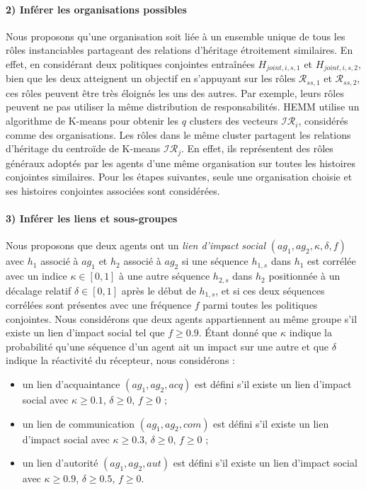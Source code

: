\documentclass[sigconf,anonymous]{aamas}
\begin{document}
\paragraph{2) Inférer les organisations possibles}

Nous proposons qu'une organisation soit liée à un ensemble unique de tous les rôles instanciables partageant des relations d'héritage étroitement similaires. En effet, en considérant deux politiques conjointes entraînées $H_{joint,i,s,1}$ et $H_{joint,i,s,2}$, bien que les deux atteignent un objectif en s'appuyant sur les rôles $\mathcal{R}_{ss,1}$ et $\mathcal{R}_{ss,2}$, ces rôles peuvent être très éloignés les uns des autres. Par exemple, leurs rôles peuvent ne pas utiliser la même distribution de responsabilités.
HEMM utilise un algorithme de K-means pour obtenir les $q$ clusters des vecteurs $\mathcal{IR}_{i}$, considérés comme des organisations. Les rôles dans le même cluster partagent les relations d'héritage du centroïde de K-means $\mathcal{IR}_j$. En effet, ils représentent des rôles généraux adoptés par les agents d'une même organisation sur toutes les histoires conjointes similaires.
Pour les étapes suivantes, seule une organisation choisie et ses histoires conjointes associées sont considérées.

\paragraph{3) Inférer les liens et sous-groupes}

Nous proposons que deux agents ont un \emph{lien d'impact social} $(ag_1, ag_2, \kappa, \delta, f)$ avec $h_1$ associé à $ag_1$ et $h_2$ associé à $ag_2$ si une séquence $h_{1,s}$ dans $h_1$ est corrélée avec un indice $\kappa \in [0,1]$ à une autre séquence $h_{2,s}$ dans $h_2$ positionnée à un décalage relatif $\delta \in [0,1]$ après le début de $h_{1,s}$, et si ces deux séquences corrélées sont présentes avec une fréquence $f$ parmi toutes les politiques conjointes.
Nous considérons que deux agents appartiennent au même groupe s'il existe un lien d'impact social tel que $f \geq 0.9$. Étant donné que $\kappa$ indique la probabilité qu'une séquence d'un agent ait un impact sur une autre et que $\delta$ indique la réactivité du récepteur, nous considérons :
\begin{itemize}
    \item un lien d'acquaintance $(ag_1, ag_2, acq)$ est défini s'il existe un lien d'impact social avec $\kappa \geq 0.1$, $\delta \geq 0$, $f \geq 0$ ;
    \item un lien de communication $(ag_1, ag_2, com)$ est défini s'il existe un lien d'impact social avec $\kappa \geq 0.3$, $\delta \geq 0$, $f \geq 0$ ;
    \item un lien d'autorité $(ag_1, ag_2, aut)$ est défini s'il existe un lien d'impact social avec $\kappa \geq 0.9$, $\delta \geq 0.5$, $f \geq 0$.
\end{itemize}
\end{document}
